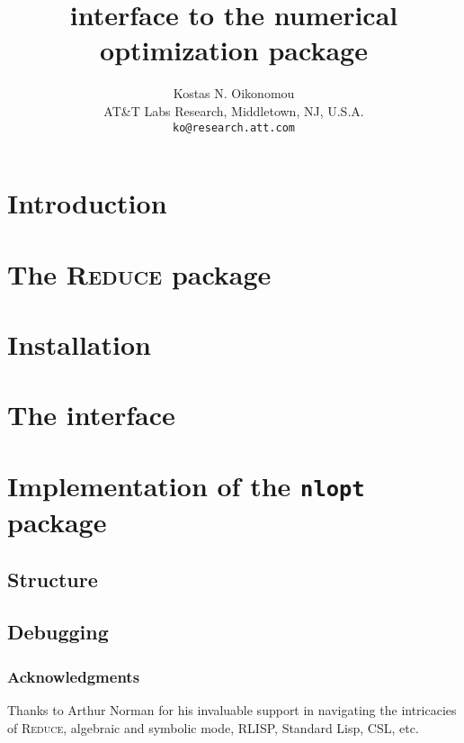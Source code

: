 \documentclass[11pt]{article}
\title{{\Reduce} interface to the {\nlopt} numerical optimization package}
\author{Kostas N. Oikonomou\\ AT\&T Labs Research, Middletown, NJ, U.S.A.
  \\ \small\texttt{ko@research.att.com}}
\newcommand{\Reduce}{\textsc{Reduce}}
\begin{document}
\maketitle

\section{Introduction}

\section{The {\Reduce} package}

\section{Installation}

\section{The interface}

\section {Implementation of the \texttt{nlopt} package}

\subsection{Structure}

\subsection{Debugging}

\subsubsection*{Acknowledgments}
Thanks to Arthur Norman for his invaluable support in navigating the intricacies
of {\Reduce}, algebraic and symbolic mode, RLISP, Standard Lisp, CSL, etc.
\end{document}
